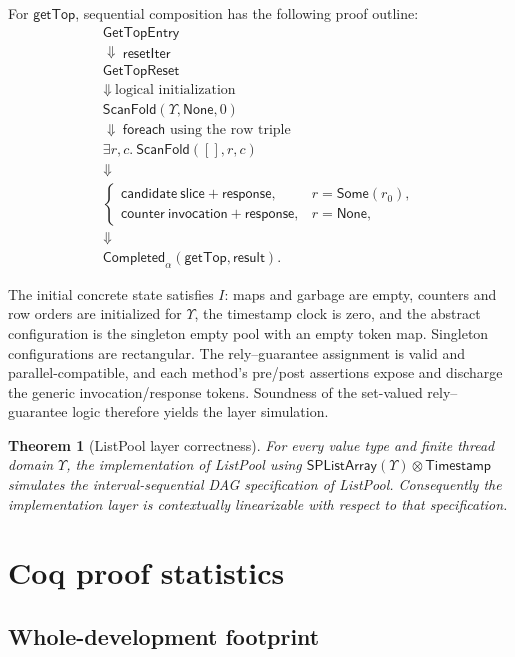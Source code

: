 \documentclass[11pt]{article}
\newtheorem{theorem}[lemma]{Theorem}
\theoremstyle{definition}
\theoremstyle{remark}
\newcommand{\GetTop}{\mathsf{getTop}}
\begin{document}
For \(\GetTop\), sequential composition has the following proof outline:
\[
\begin{array}{c}
\mathsf{GetTopEntry}
\\ \Downarrow\ \mathsf{resetIter}
\\ \mathsf{GetTopReset}
\\ \Downarrow\ \text{logical initialization}
\\ \mathsf{ScanFold}(\Upsilon,\mathsf{None},0)
\\ \Downarrow\ \mathsf{foreach}\text{ using the row triple}
\\ \exists r,c.\ \mathsf{ScanFold}([],r,c)
\\ \Downarrow
\\
\begin{cases}
\mathsf{candidate\ slice+response},&r=\mathsf{Some}(r_0),\\
\mathsf{counter\ invocation+response},&r=\mathsf{None},
\end{cases}
\\ \Downarrow
\\ \mathsf{Completed}_\alpha(\GetTop,\mathsf{result}).
\end{array}
\]

The initial concrete state satisfies \(I\): maps and garbage are empty,
counters and row orders are initialized for \(\Upsilon\), the timestamp clock
is zero, and the abstract configuration is the singleton empty pool with an
empty token map.  Singleton configurations are rectangular.  The
rely--guarantee assignment is valid and parallel-compatible, and each method's
pre/post assertions expose and discharge the generic invocation/response
tokens.  Soundness of the set-valued rely--guarantee logic therefore yields
the layer simulation.

\begin{theorem}[ListPool layer correctness]
For every value type and finite thread domain \(\Upsilon\), the implementation
of ListPool using \(\mathsf{SPListArray}(\Upsilon)\otimes\mathsf{Timestamp}\)
simulates the interval-sequential DAG specification of ListPool.  Consequently
the implementation layer is contextually linearizable with respect to that
specification.
\end{theorem}

\clearpage
\section{Coq proof statistics}

\subsection{Whole-development footprint}
\end{document}
